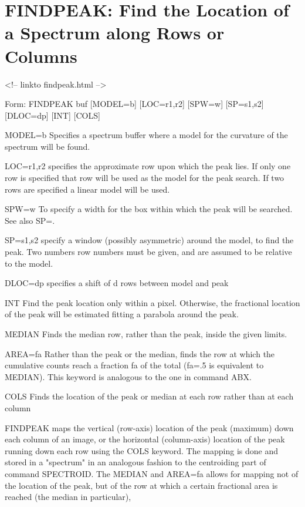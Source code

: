 \section{FINDPEAK: Find the Location of a Spectrum along Rows or
         Columns}
\begin{rawhtml}
<!-- linkto findpeak.html -->
\end{rawhtml}
\begin{command}
  \item[Form: FINDPEAK buf {[MODEL=b]} {[LOC=r1,r2]} {[SPW=w]} {[SP=s1,s2]}
       {[DLOC=dp]} {[INT]} {[COLS]}\hfill]{}
  \item[MODEL=b]{Specifies a spectrum buffer where a model for the
       curvature of the spectrum will be found.}
  \item[LOC=r1,r2]{specifies the approximate row upon which the peak lies.
       If only one row is specified that row will be used as
       the model for the peak search. If two rows are specified 
       a linear model will be used.}
  \item[SPW=w]{To specify a width for the box within which the peak
       will be searched. See also SP=.}
  \item[SP=s1,s2]{specify a window (possibly asymmetric) around the model,
       to find the peak. Two numbers row numbers must be given,
       and are assumed to be relative to the model.}
  \item[DLOC=dp]{specifies a shift of d rows between model and peak}
  \item[INT]{Find the peak location only within a pixel. Otherwise,
       the fractional location of the peak will be estimated
       fitting a parabola around the peak.}
  \item[MEDIAN]{Finds the median row, rather than the peak, inside
       the given limits.}
  \item[AREA=fa]{Rather than the peak or the median, finds the row at 
       which the cumulative counts reach a fraction fa of the 
       total (fa=.5 is equivalent to MEDIAN). This keyword is
       analogous to the one in command ABX.}
  \item[COLS]{Finds the location of the peak or median at each row
       rather than at each column}
\end{command}

FINDPEAK maps the vertical (row-axis) location of the peak (maximum) down
each column of an image, or the horizontal (column-axis) location of the
peak running down each row using the COLS keyword. The mapping is done and
stored in a "spectrum" in an analogous fashion to the centroiding part of
command SPECTROID. The MEDIAN and AREA=fa allows for mapping not of the
location of the peak, but of the row at which a certain fractional area is
reached (the median in particular),

